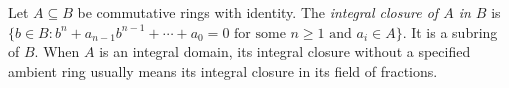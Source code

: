 
Let $A\subseteq B$ be commutative rings with identity. The \emph{integral closure of $A$ in $B$} is $\{b\in B:b^n+a_{n-1}b^{n-1}+\cdots+a_0=0\text{ for some }n\geq 1\text{ and }a_i\in A\}$. It is a subring of $B$. When $A$ is an integral domain, its integral closure without a specified ambient ring usually means its integral closure in its field of fractions.
